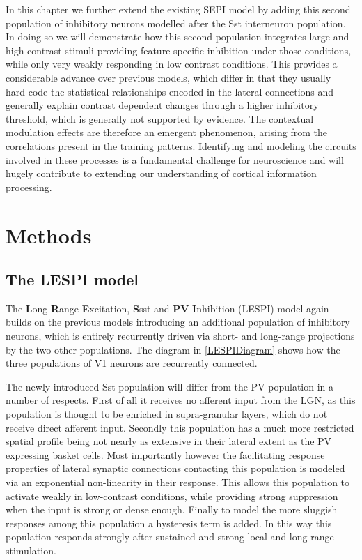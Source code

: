 In this chapter we further extend the existing SEPI model by adding
this second population of inhibitory neurons modelled after the Sst
interneuron population. In doing so we will demonstrate how this
second population integrates large and high-contrast stimuli providing
feature specific inhibition under those conditions, while only very
weakly responding in low contrast conditions. This provides a
considerable advance over previous models, which differ in that they
usually hard-code the statistical relationships encoded in the lateral
connections and generally explain contrast dependent changes through a
higher inhibitory threshold, which is generally not supported by
evidence. The contextual modulation effects are therefore an emergent
phenomenon, arising from the correlations present in the training
patterns. Identifying and modeling the circuits involved in these
processes is a fundamental challenge for neuroscience and will hugely
contribute to extending our understanding of cortical information
processing.

\section{Methods}

\subsection{The LESPI model}

The \textbf{L}ong-\textbf{R}ange \textbf{E}xcitation, \textbf{S}sst
and \textbf{PV} \textbf{I}nhibition (LESPI) model again builds on the
previous models introducing an additional population of inhibitory
neurons, which is entirely recurrently driven via short- and
long-range projections by the two other populations. The diagram in
\ref{LESPIDiagram} shows how the three populations of V1 neurons are
recurrently connected.

The newly introduced Sst population will differ from the PV population
in a number of respects. First of all it receives no afferent input
from the LGN, as this population is thought to be enriched in
supra-granular layers, which do not receive direct afferent
input. Secondly this population has a much more restricted spatial
profile being not nearly as extensive in their lateral extent as the
PV expressing basket cells. Most importantly however the facilitating
response properties of lateral synaptic connections contacting this
population is modeled via an exponential non-linearity in their
response. This allows this population to activate weakly in
low-contrast conditions, while providing strong suppression when the
input is strong or dense enough. Finally to model the more sluggish
responses among this population a hysteresis term is added. In this
way this population responds strongly after sustained and strong local
and long-range stimulation.

